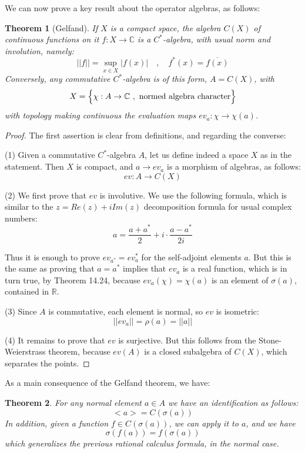 \documentclass[12pt]{amsbook}
\newtheorem{theorem}{Theorem}[chapter]
\begin{document}
We can now prove a key result about the operator algebras, as follows:

\begin{theorem}[Gelfand]
If $X$ is a compact space, the algebra $C(X)$ of continuous functions on it $f:X\to\mathbb C$ is a $C^*$-algebra, with usual norm and involution, namely:
$$||f||=\sup_{x\in X}|f(x)|\quad,\quad 
f^*(x)=\overline{f(x)}$$
Conversely, any commutative $C^*$-algebra is of this form, $A=C(X)$, with 
$$X=\Big\{\chi:A\to\mathbb C\ ,\ {\rm normed\ algebra\ character}\Big\}$$
with topology making continuous the evaluation maps $ev_a:\chi\to\chi(a)$.
\end{theorem}

\begin{proof}
The first assertion is clear from definitions, and regarding the converse:

\medskip

(1) Given a commutative $C^*$-algebra $A$, let us define indeed a space $X$ as in the statement. Then $X$ is compact, and $a\to ev_a$ is a morphism of algebras, as follows:
$$ev:A\to C(X)$$

(2) We first prove that $ev$ is involutive. We use the following formula, which is similar to the $z=Re(z)+iIm(z)$ decomposition formula for usual complex numbers:
$$a=\frac{a+a^*}{2}+i\cdot\frac{a-a^*}{2i}$$

Thus it is enough to prove $ev_{a^*}=ev_a^*$ for the self-adjoint elements $a$. But this is the same as proving that $a=a^*$ implies that $ev_a$ is a real function, which is in turn true, by Theorem 14.24, because $ev_a(\chi)=\chi(a)$ is an element of $\sigma(a)$, contained in $\mathbb R$.

\medskip

(3) Since $A$ is commutative, each element is normal, so $ev$ is isometric:
$$||ev_a||
=\rho(a)
=||a||$$

(4) It remains to prove that $ev$ is surjective. But this follows from the Stone-Weierstrass theorem, because $ev(A)$ is a closed subalgebra of $C(X)$, which separates the points.
\end{proof}

As a main consequence of the Gelfand theorem, we have:

\begin{theorem}
For any normal element $a\in A$ we have an identification as follows:
$$<a>=C(\sigma(a))$$
In addition, given a function $f\in C(\sigma(a))$, we can apply it to $a$, and we have
$$\sigma(f(a))=f(\sigma(a))$$
which generalizes the previous rational calculus formula, in the normal case.
\end{theorem}
\end{document}
